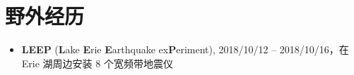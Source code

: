\section*{野外经历}

\begin{itemize}
\item \textbf{LEEP} (\textbf{L}ake \textbf{E}rie \textbf{E}arthquake ex\textbf{P}eriment),
      2018/10/12 -- 2018/10/16，在 Erie 湖周边安装 8 个宽频带地震仪
\end{itemize}
